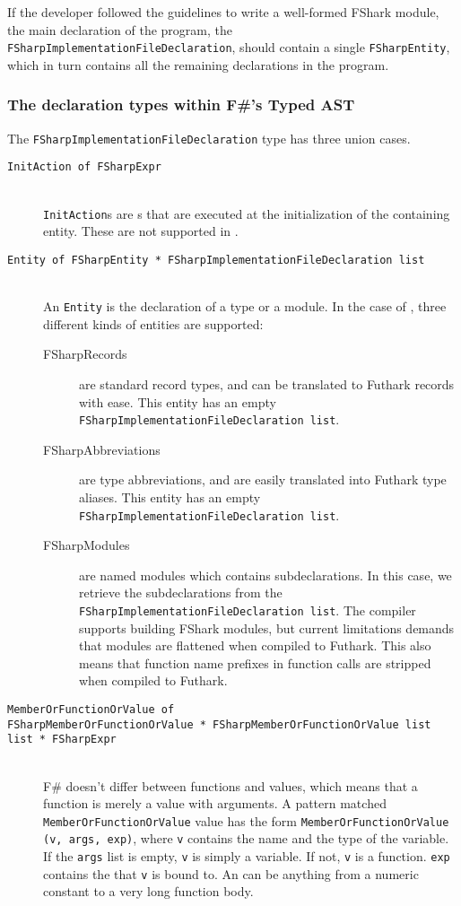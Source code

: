 If the \fshark{} developer followed the guidelines to write a well-formed FShark
module, the main declaration of the program, the
\texttt{FSharpImplementationFileDeclaration}, should contain a single
\texttt{FSharpEntity}, which in turn contains all the remaining declarations in
the program.

\subsubsection{The declaration types within F\#'s Typed AST}
The \texttt{FSharpImplementationFileDeclaration} type has three union cases.
\begin{description}
\item[\texttt{InitAction of FSharpExpr}] \hfill\\
  \texttt{InitAction}s are \fsharpexpr{}s that are executed at the
  initialization of the containing entity. These are not supported in \fshark{}.

\item[\texttt{Entity of FSharpEntity * FSharpImplementationFileDeclaration list}]\hfill\\
  An \texttt{Entity} is the declaration of a type or a module. In the case of
  \fshark{}, three different kinds of entities are supported:
  \begin{description}
  \item[FSharpRecords] are standard record types, and can be translated to
    Futhark records with ease.
    This entity has an empty \texttt{FSharpImplementationFileDeclaration list}.
  \item[FSharpAbbreviations] are type abbreviations, and are easily translated
    into Futhark type aliases.
    This entity has an empty \texttt{FSharpImplementationFileDeclaration list}.
  \item[FSharpModules] are named modules which contains subdeclarations.
    In this case, we retrieve the subdeclarations from the \texttt{FSharpImplementationFileDeclaration list}.
    The \fshark{} compiler supports building FShark modules, but current
    limitations demands that modules are flattened when compiled to Futhark.
    This also means that function name prefixes in function calls are stripped
    when compiled to Futhark.
  \end{description}
\item[\texttt{MemberOrFunctionOrValue of \\ FSharpMemberOrFunctionOrValue *
    FSharpMemberOrFunctionOrValue list list * FSharpExpr}]\hfill\\
  F\# doesn't differ between functions and values, which means that a function
  is merely a value with arguments.
  A pattern matched \texttt{MemberOrFunctionOrValue} value has the form
  \texttt{MemberOrFunctionOrValue (v, args, exp)}, where \texttt{v} contains the
  name and the type of the variable.
  If the \texttt{args} list is empty, \texttt{v} is simply a variable. If not,
  \texttt{v} is a function. \texttt{exp} contains the \fsharpexpr{} that
  \texttt{v} is bound to. An \fsharpexpr{} can be anything from a numeric
  constant to a very long function body.
\end{description}

